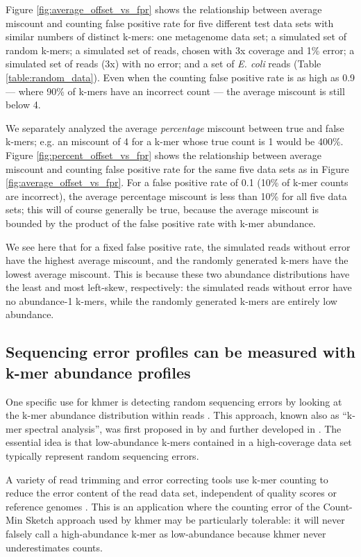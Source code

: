 \documentclass[10pt]{article}
\begin{document}
Figure \ref{fig:average_offset_vs_fpr} shows the relationship between
average miscount and counting false positive rate for five different test data
sets with similar numbers of distinct k-mers: one metagenome data set;
a simulated set of random k-mers; a simulated set of reads, chosen
with 3x coverage and 1\% error; a simulated set of reads (3x) with no
error; and a set of {\em E. coli} reads (Table
\ref{table:random_data}).  Even when the counting false positive rate is as
high as 0.9 --- where 90\% of k-mers have an incorrect count --- the
average miscount is still below 4.

We separately analyzed the average {\em percentage} miscount between
true and false k-mers; e.g. an miscount of 4 for a k-mer whose true
count is 1 would be 400\%.  Figure \ref{fig:percent_offset_vs_fpr}
shows the relationship between average miscount and counting false
positive rate for the same five data sets as in Figure
\ref{fig:average_offset_vs_fpr}.  For a false positive rate of 0.1 (10\% of
k-mer counts are incorrect), the average percentage miscount is less
than 10\% for all five data sets; this will of course generally be
true, because the average miscount is bounded by the product of the
false positive rate with k-mer abundance.

We see here that for a fixed false positive rate, the simulated reads
without error have the highest average miscount, and the randomly
generated k-mers have the lowest average miscount.  This is because
these two abundance distributions have the least and most left-skew,
respectively: the simulated reads without error have no abundance-1
k-mers, while the randomly generated k-mers are entirely low
abundance.

\subsection*{Sequencing error profiles can be measured with k-mer abundance
profiles}

One specific use for khmer is detecting random sequencing errors by
looking at the k-mer abundance distribution within reads
\cite{Medvedev2011}.  This approach, known also as ``k-mer spectral
analysis'', was first proposed in by \cite{Pevzner2001} and further
developed in \cite{Li2003}.  The essential idea is that low-abundance
k-mers contained in a high-coverage data set typically represent
random sequencing errors.

A variety of read trimming and error correcting tools use k-mer
counting to reduce the error content of the read data set, independent
of quality scores or reference genomes \cite{Kelley2010}.  This is an
application where the counting error of the Count-Min Sketch approach
used by khmer may be particularly tolerable: it will never falsely
call a high-abundance k-mer as low-abundance because khmer never
underestimates counts.
\end{document}
